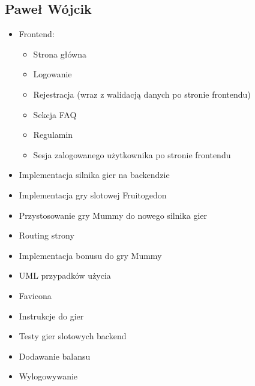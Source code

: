 \documentclass[a4paper,12pt]{article}
\begin{document}
\subsection{Paweł Wójcik}
\begin{itemize}
    \item Frontend:
    \begin{itemize}
        \item Strona główna
        \item Logowanie
        \item Rejestracja (wraz z walidacją danych po stronie frontendu)
        \item Sekcja FAQ
        \item Regulamin
        \item Sesja zalogowanego użytkownika po stronie frontendu
    \end{itemize}
    \item Implementacja silnika gier na backendzie
    \item Implementacja gry slotowej Fruitogedon
    \item Przystosowanie gry Mummy do nowego silnika gier
    \item Routing strony
    \item Implementacja bonusu do gry Mummy
    \item UML przypadków użycia
    \item Favicona
    \item Instrukcje do gier
    \item Testy gier slotowych backend
    \item Dodawanie balansu
    \item Wylogowywanie
\end{itemize}


\newpage

\printbibliography[heading=bibintoc]
\end{document}
